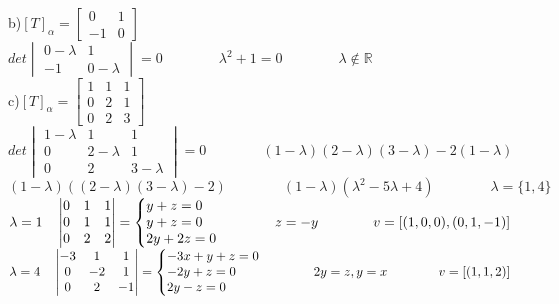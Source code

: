 \documentclass[12pt]{article}
\begin{document}
\noindent b)\quad$[T]_{\alpha}=\begin{bmatrix}0&1\\-1&0\end{bmatrix}$\\

$det\begin{vmatrix}0-\lambda&1\\-1&0-\lambda\end{vmatrix}=0\qquad\qquad\lambda^{2}+1=0\qquad\qquad\lambda\notin\mathds{R}$\\

\noindent c)\quad$[T]_{\alpha}=\begin{bmatrix}1&1&1\\0&2&1\\0&2&3\end{bmatrix}$\\

$det\begin{vmatrix}1-\lambda&1&1\\0&2-\lambda&1\\0&2&3-\lambda\end{vmatrix}=0\qquad\qquad(1-\lambda)(2-\lambda)(3-\lambda)-2(1-\lambda)$\\

$(1-\lambda)((2-\lambda)(3-\lambda)-2)\qquad\qquad(1-\lambda)(\lambda^{2}-5\lambda+4)\qquad\qquad\lambda=\lbrace1,4\rbrace$\\

$\lambda=1\quad\begin{vmatrix}0&1&1\\0&1&1\\0&2&2\end{vmatrix}=\left\{\begin{array}{@{}l@{}}y+z=0\\y+z=0\\2y+2z=0\end{array}\right.\qquad\qquad z=-y\qquad\qquad v=[(1,0,0),(0,1,-1)]$\\

$\lambda=4\quad\begin{vmatrix}-3&1&1\\0&-2&1\\0&2&-1\end{vmatrix}=\left\{\begin{array}{@{}l@{}}-3x+y+z=0\\-2y+z=0\\2y-z=0\end{array}\right.\qquad\qquad 2y=z, y=x\qquad\qquad v=[(1,1,2)]$\\
\end{document}
